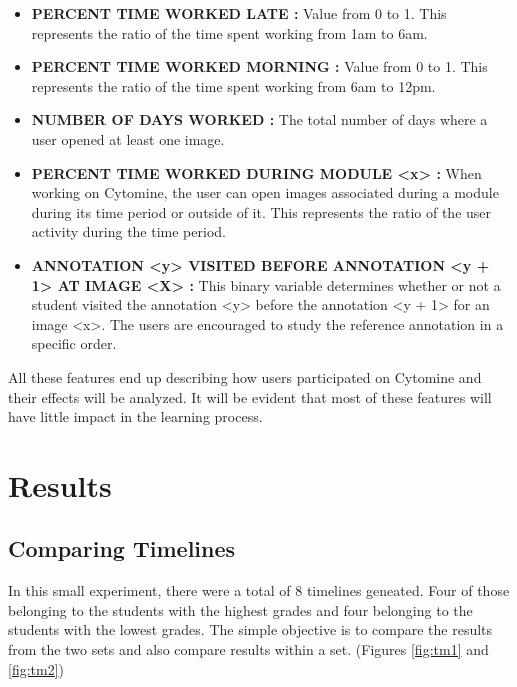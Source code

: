 \documentclass[a4paper,11pt]{report}
\numberwithin{figure}{section} %
\begin{document}
\begin{itemize}
    \item[\textbullet] \textbf{PERCENT TIME WORKED LATE :} Value from 0 to 1.
    This represents the ratio of the time spent working from 1am to 6am.

    \item[\textbullet] \textbf{PERCENT TIME WORKED MORNING :} Value from 0 to 1.
    This represents the ratio of the time spent working from 6am to 12pm.

    \item[\textbullet] \textbf{NUMBER OF DAYS WORKED :} The total number of days where a user opened at least one image.

    \item[\textbullet] \textbf{PERCENT TIME WORKED DURING MODULE <x> :} When working on Cytomine, the user can open images associated during a module during its time period or outside of it.
    This represents the ratio of the user activity during the time period.

	\item[\textbullet] \textbf{ANNOTATION <y> VISITED BEFORE ANNOTATION <y + 1> AT IMAGE <X> :} This binary variable determines whether or not a student visited the annotation <y> before the annotation <y + 1> for an image <x>.
	The users are encouraged to study the reference annotation in a specific order.

    \end{itemize}


    All these features end up describing how users participated on Cytomine and their effects will be analyzed.
    It will be evident that most of these features will have little impact in the learning process.

    \section{Results}

    \subsection{Comparing Timelines}

        In this small experiment, there were a total of 8 timelines geneated.
        Four of those belonging to the students with the highest grades and four belonging to the students with the lowest grades.
        The simple objective is to compare the results from the two sets and also compare results within a set. (Figures \ref{fig:tm1} and \ref{fig:tm2})
\end{document}

